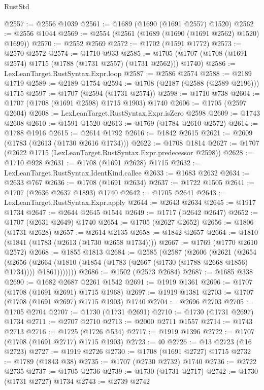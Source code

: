 \begin{lexlean}{RustStd}
\begin{coremodule}
@2557 := @2556 @1039
@2561 := @1689 (@1690 (@1691 @2557) @1520)
@2562 := @2556 @1044
@2569 := @2554 (@2561 (@1689 (@1690 (@1691 @2562) @1520) @1699))
@2570 := @2552 @2569
@2572 := @1702 (@1591 @1772)
@2573 := @2570 @2572
@2574 := @1710 @933
@2585 := @1705 (@1707 (@1708 (@1691 @2574) @1715 (@1788 (@1731 @2557) (@1731 @2562))) @1740)
@2586 := LexLeanTarget.RustSyntax.Expr.loop
@2587 := @2586 @2574
@2588 := @2189 @1719
@2589 := @2189 @1754
@2594 := @1708 (@2187 (@2588 (@2589 @2196))) @1715
@2597 := @1707 (@2594 (@1731 @2574))
@2598 := @1710 @738
@2604 := @1707 (@1708 (@1691 @2598) @1715 @1903) @1740
@2606 := @1705 (@2597 @2604)
@2608 := LexLeanTarget.RustSyntax.Expr.isZero @2598
@2609 := @1743 @2608
@2610 := @1591 @1520
@2613 := @1769 (@1784 @2610 @2572)
@2614 := @1788 @1916
@2615 := @2614 @1792
@2616 := @1842 @2615
@2621 := @2609 (@1783 (@2613 (@1730 @2616 @1734)))
@2622 := @1708 @1814
@2627 := @1707 (@2622 @1715 (LexLeanTarget.RustSyntax.Expr.predecessor @2598))
@2628 := @1710 @928
@2631 := @1708 (@1691 @2628) @1715
@2632 := LexLeanTarget.RustSyntax.IdentKind.callee
@2633 := @1683 @2632
@2634 := @2633 @767
@2636 := @1708 (@1691 @2634)
@2637 := @1722 @1505
@2641 := @1707 (@2636 @2637 @1893) @1740
@2642 := @1705 @2641
@2643 := LexLeanTarget.RustSyntax.Expr.apply
@2644 := @2643 @2634
@2645 := @1917 @1734
@2647 := @2644 @2645 @1544
@2649 := @1717 (@2642 @2647)
@2652 := @1707 (@2631 @2649) @1740
@2654 := @1705 (@2627 @2652)
@2656 := @1806 (@1731 @2628)
@2657 := @2614 @2135
@2658 := @1842 @2657
@2664 := @1810 (@1841 (@1783 (@2613 (@1730 @2658 @1734))))
@2667 := @1769 (@1770 @2610 @2572)
@2668 := @1855 @1813
@2684 := @2585
    (@2587
      (@2606
        (@2621
          (@2654
            (@2656
              (@2664 (@1810 (@1854 (@1783 (@2667 (@1730 (@1788 @2668 @1856) @1734)))) @1861)))))))
@2686 := @1502 (@2573 @2684)
@2687 := @1685 @338
@2690 := @1682 @2687 @2261 @1542
@2691 := @1919 @1361
@2696 := @1707 (@1708 (@1691 @2691) @1715 @1968)
@2697 := @1919 @1381
@2703 := @1707 (@1708 (@1691 @2697) @1715 @1903) @1740
@2704 := @2696 @2703
@2705 := @1705 @2704
@2707 := @1730 (@1731 @2691)
@2710 := @1730 (@1731 @2697) @1734
@2711 := @2707 @2710
@2713 := @2000 @2711 @1557
@2714 := @1743 @2713
@2716 := @1725 (@1726 @534)
@2717 := @1919 @1396
@2722 := @1707 (@1708 (@1691 @2717) @1715 @1903)
@2723 := 40
@2726 := @13 @2723 (@16 @2723)
@2727 := @1919 @2726
@2730 := @1708 (@1691 @2727) @1715
@2732 := @1789 (@1843 @38)
@2735 := @1707 (@2730 @2732) @1740
@2736 := @2722 @2735
@2737 := @1705 @2736
@2739 := @1730 (@1731 @2717)
@2742 := @1730 (@1731 @2727) @1734
@2743 := @2739 @2742

\end{coremodule}
\end{lexlean}
